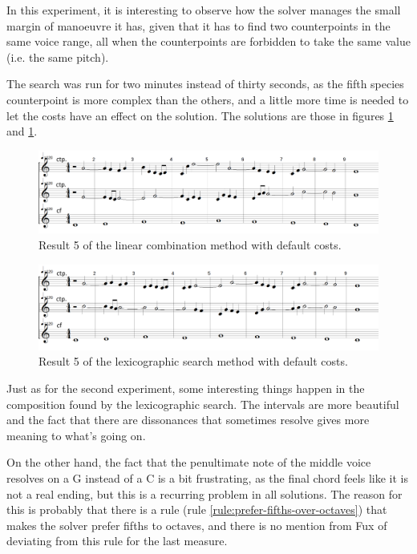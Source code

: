 In this experiment, it is interesting to observe how the solver manages the small margin of manoeuvre it has, given that it has to find two counterpoints in the same voice range, all when the counterpoints are forbidden to take the same value (i.e. the same pitch).

The search was run for two minutes instead of thirty seconds, as the fifth species counterpoint is more complex than the others, and a little more time is needed to let the costs have an effect on the solution. The solutions are those in figures \ref{fig:combili-5sp} and \ref{fig:combili-5sp}.

\begin{figure}[h]
    \centering
    \includegraphics[width=1\textwidth]{Images/Experiments/linear-combination-5sp.png}
    \caption{Result 5 of the linear combination method with default costs.}
    \label{fig:combili-5sp}
\end{figure}

\begin{figure}[h]
    \centering
    \includegraphics[width=1\textwidth]{Images/Experiments/basic-lexico-5sp.png}
    \caption{Result 5 of the lexicographic search method with default costs.}
    \label{fig:lexico-5sp}
\end{figure}

Just as for the second experiment, some interesting things happen in the composition found by the lexicographic search. The intervals are more beautiful and the fact that there are dissonances that sometimes resolve gives more meaning to what's going on.

On the other hand, the fact that the penultimate note of the middle voice resolves on a G instead of a C is a bit frustrating, as the final chord feels like it is not a real ending, but this is a recurring problem in all solutions. The reason for this is probably that there is a rule (rule \ref{rule:prefer-fifths-over-octaves}) that makes the solver prefer fifths to octaves, and there is no mention from Fux of deviating from this rule for the last measure.

